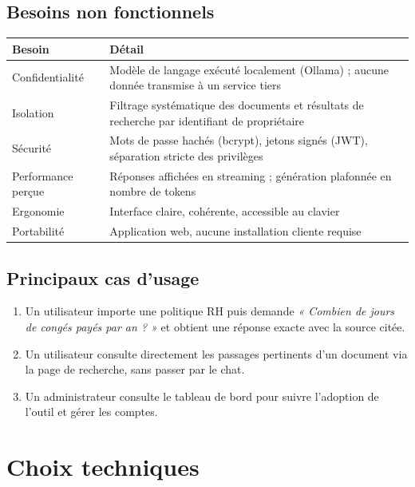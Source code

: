 \documentclass[12pt,a4paper]{article}
\begin{document}
\subsection{Besoins non fonctionnels}

\begin{table}[h]
\centering
\begin{tabular}{|l|p{9cm}|}
\hline
\textbf{Besoin} & \textbf{Détail} \\
\hline
Confidentialité & Modèle de langage exécuté localement (Ollama) ; aucune donnée transmise à un service tiers \\
Isolation & Filtrage systématique des documents et résultats de recherche par identifiant de propriétaire \\
Sécurité & Mots de passe hachés (bcrypt), jetons signés (JWT), séparation stricte des privilèges \\
Performance perçue & Réponses affichées en streaming ; génération plafonnée en nombre de tokens \\
Ergonomie & Interface claire, cohérente, accessible au clavier \\
Portabilité & Application web, aucune installation cliente requise \\
\hline
\end{tabular}
\end{table}

\subsection{Principaux cas d'usage}
\begin{enumerate}
  \item Un utilisateur importe une politique RH puis demande \textit{« Combien de jours de congés payés par an ? »} et obtient une réponse exacte avec la source citée.
  \item Un utilisateur consulte directement les passages pertinents d'un document via la page de recherche, sans passer par le chat.
  \item Un administrateur consulte le tableau de bord pour suivre l'adoption de l'outil et gérer les comptes.
\end{enumerate}

\section{Choix techniques}
\end{document}
